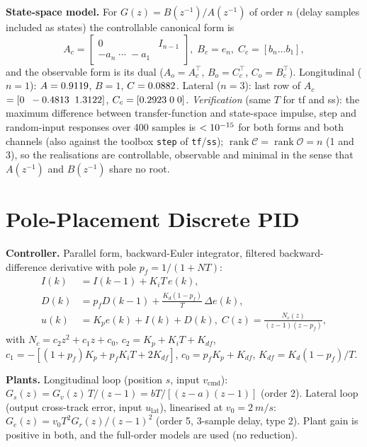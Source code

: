 \documentclass[conference]{IEEEtran}
\newcommand{\z}{z^{-1}}
\begin{document}
\textbf{State-space model.} For $G(z)=B(\z)/A(\z)$ of order $n$ (delay samples included as states) the controllable canonical form is
\begin{equation}
A_c=\begin{bmatrix}0&I_{n-1}\\-a_n\;\cdots\;-a_1\end{bmatrix},\; B_c=e_n,\; C_c=[b_n\dots b_1],
\end{equation}
and the observable form is its dual ($A_o=A_c^\top$, $B_o=C_c^\top$, $C_o=B_c^\top$). Longitudinal ($n=1$): $A=0.9119$, $B=1$, $C=0.0882$. Lateral ($n=3$): last row of $A_c$ $=[0\;\;-0.4813\;\;1.3122]$, $C_c=[0.2923\;0\;0]$. \emph{Verification} (same $T$ for tf and ss): the maximum difference between transfer-function and state-space impulse, step and random-input responses over 400 samples is $<10^{-15}$ for both forms and both channels (also against the toolbox \texttt{step} of \texttt{tf}/\texttt{ss}); $\operatorname{rank}\mathcal C=\operatorname{rank}\mathcal O=n$ (1 and 3), so the realisations are controllable, observable and minimal in the sense that $A(\z)$ and $B(\z)$ share no root.

\section{Pole-Placement Discrete PID}\label{sec:pid}
\textbf{Controller.} Parallel form, backward-Euler integrator, filtered backward-difference derivative with pole $p_f=1/(1+NT)$:
\begin{align}
I(k)&=I(k-1)+K_iT\,e(k),\nonumber\\
D(k)&=p_fD(k-1)+\tfrac{K_d(1-p_f)}{T}\,\Delta e(k),\nonumber\\
u(k)&=K_pe(k)+I(k)+D(k),\; C(z)=\tfrac{N_c(z)}{(z-1)(z-p_f)},
\label{eq:pid}
\end{align}
with $N_c=c_2z^2+c_1z+c_0$, $c_2=K_p+K_iT+K_{df}$, $c_1=-[(1+p_f)K_p+p_fK_iT+2K_{df}]$, $c_0=p_fK_p+K_{df}$, $K_{df}=K_d(1-p_f)/T$.

\textbf{Plants.} Longitudinal loop (position $s$, input $v_\mathrm{cmd}$): $G_s(z)=G_v(z)\,T/(z-1)=bT/[(z-a)(z-1)]$ (order 2). Lateral loop (output cross-track error, input $u_\mathrm{lat}$), linearised at $v_0=\SI{2}{m/s}$: $G_{e}(z)=v_0T^2G_r(z)/(z-1)^2$ (order 5, 3-sample delay, type 2). Plant gain is positive in both, and the full-order models are used (no reduction).
\end{document}
